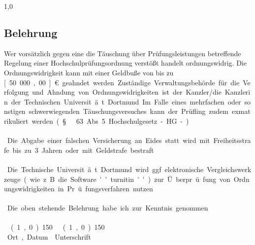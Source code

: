 \begin{spacing}{1,0}
\subsection*{Belehrung}
Wer vorsätzlich gegen eine die T\"auschung über Prüfungsleistungen betreffende Regelung einer Hochschulprüfungsordnung
verstößt handelt ordnungswidrig. Die Ordnungswidrigkeit kann mit einer Geldbu\ss e von bis zu \unit[50.000,00]{\euro} geahndet werden. Zuständige Verwaltungsbehörde für die Verfolgung und Ahndung von Ordnungswidrigkeiten ist
der Kanzler/die Kanzlerin der Technischen Universit\"at Dortmund. Im Falle eines mehrfachen oder sonstigen schwerwiegenden Täuschungsversuches kann der Prüfling zudem exmatrikuliert werden (\S\ 63 Abs. 5 Hochschulgesetz - HG - ).\\
\ \\
Die Abgabe einer falschen Versicherung an Eides statt wird mit Freiheitsstrafe bis zu 3 Jahren oder mit Geldstrafe bestraft.\\
\ \\
Die Technische Universit\"at Dortmund wird ggf. elektronische Vergleichswerkzeuge (wie z.B. die Software ''turnitin'') zur \"Uberpr\"ufung von Ordnungswidrigkeiten in Pr\"ufungsverfahren nutzen.\\
\ \\
Die oben stehende Belehrung habe ich zur Kenntnis genommen.
\vspace*{1cm}
\ \\
\ \\
\line(1,0){150} \hfill \line(1,0){150}\\
Ort, Datum \hfill Unterschrift \hspace*{3cm}
\vspace*{\fill}
\end{spacing}
